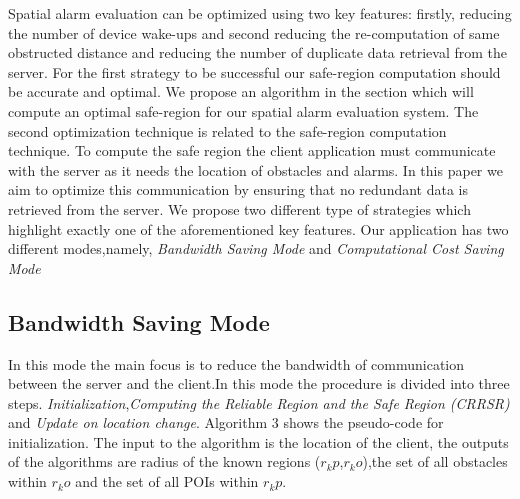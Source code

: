 \documentclass{sig-alternate}
\begin{document}
Spatial alarm evaluation can be optimized using two key features: firstly, reducing the number of device wake-ups and second reducing the re-computation of same obstructed distance and reducing the number of duplicate data retrieval from the server. For the first strategy to be successful our safe-region computation should be accurate and optimal. We propose an algorithm in the section which will compute an optimal safe-region for our spatial alarm evaluation system. The second optimization technique is related to the safe-region computation technique. To compute the safe region the client application must communicate with the server as it needs the location of obstacles and alarms. In this paper we aim to optimize this communication by ensuring that no redundant data is retrieved from the server. We propose two different type of strategies which highlight exactly one of the aforementioned key features. Our application has two different modes,namely, \textit{Bandwidth Saving Mode} and \textit{Computational Cost Saving Mode}


\subsection{Bandwidth Saving Mode}
In this mode the main focus is to reduce the bandwidth of communication between the server and the client.In this mode the procedure is divided into three steps. \textit{Initialization},\textit{Computing the Reliable Region and the Safe Region (CRRSR)} and \textit{Update on location change}. Algorithm 3 shows the pseudo-code for initialization. The input to the algorithm is the location of the client, the outputs of the algorithms are radius of the known regions ($r_kp$,$r_ko$),the set of all obstacles within $r_ko$ and the set of all POIs within $r_kp$.
\end{document}
